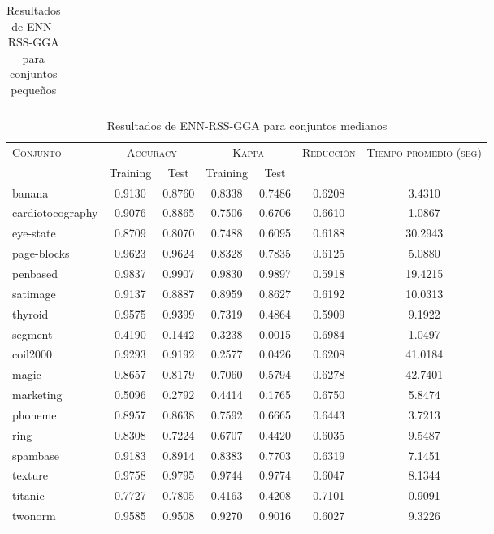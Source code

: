 \begin{table}[]
\begin{tabular}{l c c c c c c}
\hline
\end{tabular}
\caption{Resultados de ENN-RSS-GGA para conjuntos pequeños }
\label{res-peq-enn-rss-gga}
\end{table}



\begin{table}[]
\centering
\begin{tabular}{l c c c c c c}
\hline
\multirow{2}{*}{\textsc{Conjunto}}
	& \multicolumn{2}{c}{\textsc{Accuracy}}
	& \multicolumn{2}{c}{\textsc{Kappa}}
	& \textsc{Reducción}
	& \textsc{Tiempo promedio (seg)} \\
	& Training & Test
	& Training & Test \\ 
\hline
\hline

banana & 0.9130 & 0.8760 & 0.8338 & 0.7486 & 0.6208 & 3.4310 \\
cardiotocography & 0.9076 & 0.8865 & 0.7506 & 0.6706 & 0.6610 & 1.0867 \\
eye-state & 0.8709 & 0.8070 & 0.7488 & 0.6095 & 0.6188 & 30.2943 \\
page-blocks & 0.9623 & 0.9624 & 0.8328 & 0.7835 & 0.6125 & 5.0880 \\
penbased & 0.9837 & 0.9907 & 0.9830 & 0.9897 & 0.5918 & 19.4215 \\
satimage & 0.9137 & 0.8887 & 0.8959 & 0.8627 & 0.6192 & 10.0313 \\
thyroid & 0.9575 & 0.9399 & 0.7319 & 0.4864 & 0.5909 & 9.1922 \\
segment & 0.4190 & 0.1442 & 0.3238 & 0.0015 & 0.6984 & 1.0497 \\
coil2000 & 0.9293 & 0.9192 & 0.2577 & 0.0426 & 0.6208 & 41.0184 \\
magic & 0.8657 & 0.8179 & 0.7060 & 0.5794 & 0.6278 & 42.7401 \\
marketing & 0.5096 & 0.2792 & 0.4414 & 0.1765 & 0.6750 & 5.8474 \\
phoneme & 0.8957 & 0.8638 & 0.7592 & 0.6665 & 0.6443 & 3.7213 \\
ring & 0.8308 & 0.7224 & 0.6707 & 0.4420 & 0.6035 & 9.5487 \\
spambase & 0.9183 & 0.8914 & 0.8383 & 0.7703 & 0.6319 & 7.1451 \\
texture & 0.9758 & 0.9795 & 0.9744 & 0.9774 & 0.6047 & 8.1344 \\
titanic & 0.7727 & 0.7805 & 0.4163 & 0.4208 & 0.7101 & 0.9091 \\
twonorm & 0.9585 & 0.9508 & 0.9270 & 0.9016 & 0.6027 & 9.3226 \\

\hline
\end{tabular}
\caption{Resultados de ENN-RSS-GGA para conjuntos medianos }
\label{res-med-enn-rss-gga}
\end{table}



